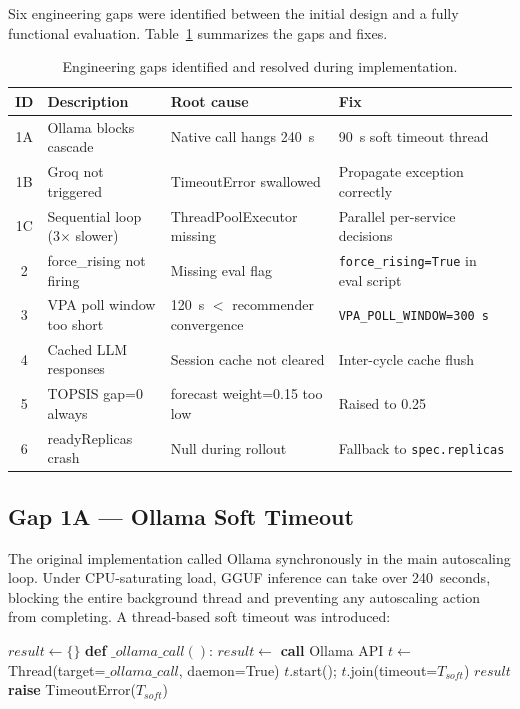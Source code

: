 Six engineering gaps were identified between the initial design and a fully
functional evaluation. Table~\ref{tab:gaps} summarizes the gaps and fixes.

\begin{table}[h]
  \centering
  \caption{Engineering gaps identified and resolved during implementation.}
  \label{tab:gaps}
  \small
  \begin{tabular}{clll}
    \toprule
    ID & Description & Root cause & Fix \\
    \midrule
    1A & Ollama blocks cascade & Native call hangs 240~s & 90~s soft timeout thread \\
    1B & Groq not triggered    & TimeoutError swallowed & Propagate exception correctly \\
    1C & Sequential loop (3$\times$ slower) & ThreadPoolExecutor missing & Parallel per-service decisions \\
    2  & force\_rising not firing & Missing eval flag & \texttt{force\_rising=True} in eval script \\
    3  & VPA poll window too short & 120~s $<$ recommender convergence & \texttt{VPA\_POLL\_WINDOW=300~s} \\
    4  & Cached LLM responses & Session cache not cleared & Inter-cycle cache flush \\
    5  & TOPSIS gap=0 always   & forecast weight=0.15 too low & Raised to 0.25 \\
    6  & readyReplicas crash   & Null during rollout & Fallback to \texttt{spec.replicas} \\
    \bottomrule
  \end{tabular}
\end{table}

\subsection{Gap 1A — Ollama Soft Timeout}
\label{sec:gap1a}

The original implementation called Ollama synchronously in the main autoscaling
loop. Under CPU-saturating load, GGUF inference can take over 240~seconds,
blocking the entire background thread and preventing any autoscaling action from
completing. A thread-based soft timeout was introduced:

\begin{algorithm}
  \caption{Ollama soft timeout wrapper}
  \label{alg:soft-timeout}
  \begin{algorithmic}[1]
    \State $result \gets \{\}$
    \State \textbf{def} $\_ollama\_call()$: $result \gets$ \textbf{call} Ollama API
    \State $t \gets$ Thread(target=$\_ollama\_call$, daemon=True)
    \State $t$.start(); $t$.join(timeout=$T_{soft}$)
      \State \Return $result$
    \Else
      \State \textbf{raise} TimeoutError($T_{soft}$)
    \EndIf
  \end{algorithmic}
\end{algorithm}

